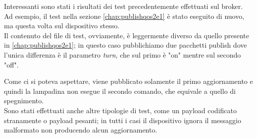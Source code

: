 \documentclass[binding=0.6cm,TFA]{sapthesis}
\begin{document}
\begin{large}
Interessanti sono stati i risultati dei test precedentemente effettuati sul broker. Ad esempio, il test nella sezione \ref{chap:publishqos2e1} è stato eseguito di nuovo, ma questa volta sul dispositivo stesso. \\
Il contenuto del file di test, ovviamente, è leggermente diverso da quello presente in \ref{chap:publishqos2e1}; in questo caso pubblichiamo due pacchetti publish dove l'unica differenza è il parametro \textit{turn}, che sul primo è "on" mentre sul secondo "off". \\

\newpage
\begin{python}
\end{python}
Come ci si poteva aspettare, viene pubblicato solamente il primo aggiornamento e quindi la lampadina non esegue il secondo comando, che equivale a quello di spegnimento. \\

Sono stati effettuati anche altre tipologie di test, come un payload codificato stranamente o payload pesanti; in tutti i casi il dispositivo ignora il messaggio malformato non producendo alcun aggiornamento. \\


\end{large}
\end{document}
